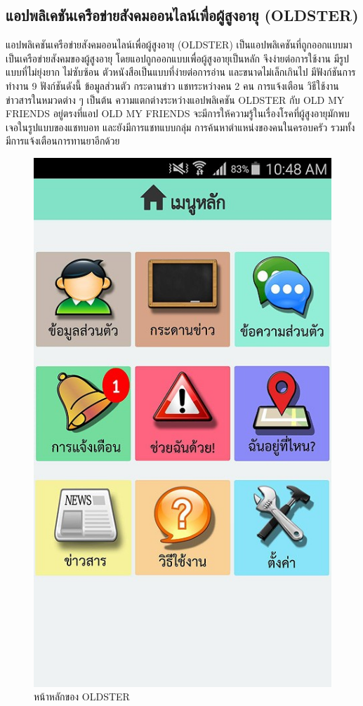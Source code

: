 \begin{enumerate}
		 \subsection{แอปพลิเคชันเครือข่ายสังคมออนไลน์เพื่อผู้สูงอายุ (OLDSTER) }
		 แอปพลิเคชันเครือข่ายสังคมออนไลน์เพื่อผู้สูงอายุ (OLDSTER) \cite{PSU} เป็นแอปพลิเคชันที่ถูกออกแบบมาเป็นเครือข่ายสังคมของผู้สูงอายุ โดยแอปถูกออกแบบเพื่อผู้สูงอายุเป็นหลัก จึงง่ายต่อการใช้งาน มีรูปแบบที่ไม่ยุ่งยาก ไม่ซับซ้อน ตัวหนังสือเป็นแบบที่ง่ายต่อการอ่าน และขนาดไม่เล็กเกินไป 
		 มีฟังก์ชันการทำงาน 9 ฟังก์ชันดังนี้ ข้อมูลส่วนตัว กระดานข่าว แชทระหว่างคน 2 คน การแจ้งเตือน วิธีใช้งาน ข่าวสารในหมวดต่าง ๆ เป็นต้น ความแตกต่างระหว่างแอปพลิเคชัน OLDSTER กับ OLD MY FRIENDS อยู่ตรงที่แอป OLD MY FRIENDS
		 จะมีการให้ความรู้ในเรื่องโรคที่ผู้สูงอายุมักพบเจอในรูปแบบของแชทบอท และยังมีการแชทแบบกลุ่ม การค้นหาตำแหน่งของคนในครอบครัว รวมทั้งมีการแจ้งเตือนการทานยาอีกด้วย
			 \begin{figure}[H]
			 	\centering
			 	\includegraphics[width=0.6\columnwidth]{Figures/2/ref1}
			 	\caption{หน้าหลักของ OLDSTER}
			 	\label{Fig:Studentloan1}
			 \end{figure}
			 

\end{enumerate}
